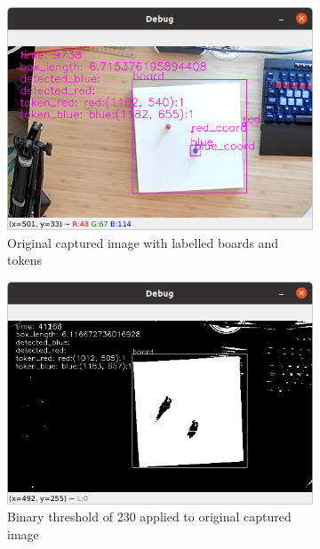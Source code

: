 \documentclass[12pt]{article}
\begin{document}
\begin{figure}[H]
    \centering
    \begin{subfigure}{0.4\textwidth}
        \includegraphics[width=1\textwidth]{images/figures/fig8a}
        \caption{Original captured image with labelled boards and tokens}
        \label{fig:debuga}
    \end{subfigure}
    \begin{subfigure}{0.4\textwidth}
        \includegraphics[width=1\textwidth]{images/figures/fig8b}
        \caption{Binary threshold of 230 applied to original captured image}
        \label{fig:debugb}
    \end{subfigure}
    \begin{subfigure}{0.4\textwidth}

\end{subfigure}
\end{figure}
\end{document}
